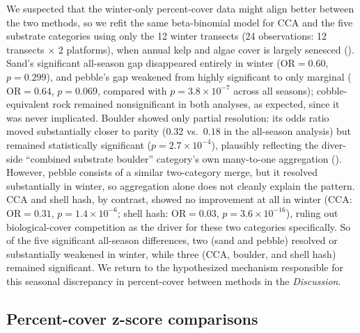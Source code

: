 \documentclass[11pt]{article}
\begin{document}
We suspected that the winter-only percent-cover data might align better between
the two methods, so we refit the same beta-binomial model for CCA and the
five substrate categories using only the 12 winter transects (24 observations: 12 transects 
$\times$ 2 platforms), when annual kelp and algae cover is largely senesced 
().
Sand's significant all-season gap disappeared entirely in winter
($\mathrm{OR}=0.60$, $p=0.299$), and pebble's gap weakened from highly
significant to only marginal ($\mathrm{OR}=0.64$, $p=0.069$, compared with
$p=3.8\times10^{-7}$ across all seasons); cobble-equivalent rock remained
nonsignificant in both analyses, as expected, since it was never implicated.
Boulder showed only partial resolution: its odds ratio moved substantially
closer to parity ($0.32$ vs.\ $0.18$ in the all-season analysis) but remained
statistically significant ($p=2.7\times10^{-4}$), plausibly reflecting the
diver-side ``combined substrate boulder'' category's own many-to-one
aggregation (). 
However, pebble consists of a similar two-category merge, but it resolved 
substantially in winter, so aggregation alone does not cleanly explain the 
pattern.
CCA and shell hash, by contrast, showed no improvement at all in winter (CCA:
$\mathrm{OR}=0.31$, $p=1.4\times10^{-6}$; shell hash: $\mathrm{OR}=0.03$,
$p=3.6\times10^{-16}$), ruling out biological-cover competition as the driver
for these two categories specifically.
So of the five significant all-season differences, two (sand and pebble)
resolved or substantially weakened in winter, while three (CCA, boulder, and
shell hash) remained significant.
We return to the hypothesized mechanism responsible for this seasonal 
discrepancy in percent-cover between methods in the \textit{Discussion}. 

\subsection{Percent-cover z-score comparisons}
\label{subsec:percent-cover_z-score}
\end{document}
